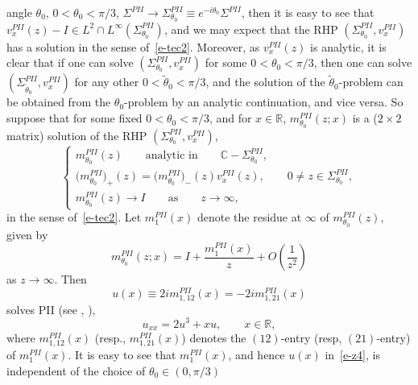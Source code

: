 \documentclass{amsart}
\theoremstyle{definition}
\theoremstyle{remark}
\numberwithin{equation}{section}
\newcommand{\C}{\mathbb C}
\newcommand{\R}{\mathbb R}
\newcommand{\wt}{\widetilde}
\begin{document}
angle $\theta_0$, $0<\theta_0<\pi/3$, $\Sigma^{PII}\to 
\Sigma^{PII}_{\theta_0}\equiv e^{-i\theta_0}\Sigma^{PII}$, then it is 
easy to see that $v_x^{PII}(z)-I\in 
L^2\cap L^{\infty}(\Sigma^{PII}_{\theta_0})$, 
and we may expect that the RHP $(\Sigma^{PII}_{\theta_0},v_x^{PII})$ 
has a solution in the sense of~\eqref{e-tec2}.
Moreover, as $v_x^{PII}(z)$ is analytic, it is clear that if one can 
solve $(\Sigma^{PII}_{\theta_0},v_x^{PII})$ for some $0<\theta_0<\pi/3$, 
then one can solve $(\Sigma^{PII}_{\wt{\theta}_0},v_x^{PII})$ 
for any other $0<\wt{\theta}_0<\pi/3$, and the solution of the 
$\wt{\theta}_0$-problem can be obtained from the $\theta_0$-problem 
by an analytic continuation, and vice versa.
So suppose that for some fixed $0<\theta_0<\pi/3$, and for 
$x\in\R$,  
$m_{\theta_0}^{PII}(z;x)$ is a ($2\times 2$ matrix) solution of the RHP 
$(\Sigma_{\theta_0}^{PII}, v_x^{PII})$, 
\begin{equation}\label{e-mPII}
  \begin{cases}
     m^{PII}_{\theta_0}(z) \qquad  
\text{analytic in} \qquad   \C -\Sigma_{\theta_0}^{PII},\\
     \bigl(m_{\theta_0}^{PII}\bigr)_+(z)=
\bigl(m_{\theta_0}^{PII}\bigr)_-(z) v_x^{PII}(z) , 
\qquad 0\neq z\in \Sigma_{\theta_0}^{PII},\\
     m^{PII}_{\theta_0}(z)\to I \qquad \text{as} \qquad z\to\infty, 
  \end{cases}
\end{equation}
in the sense of~\eqref{e-tec2}.
Let $m_1^{PII}(x)$ denote the residue at $\infty$ of 
$m_{\theta_0}^{PII}(z)$, given by
\begin{equation*}
   m_{\theta_0}^{PII}(z;x)=I+\frac{m_1^{PII}(x)}{z}+O(\frac1{z^2})
\end{equation*}
as $z\to\infty$.
Then 
\begin{equation}\label{e-z4}
   u(x)\equiv 2im_{1,12}^{PII}(x)=-2im_{1,21}^{PII}(x)
\end{equation}
solves PII (see \cite{FN}, \cite{JMU}), 
\begin{equation*}
   u_{xx}=2u^3+xu,\qquad x\in\R,
\end{equation*}
where $m_{1,12}^{PII}(x)$ (resp., $m_{1,21}^{PII}(x)$) denotes 
the $(12)$-entry (resp, $(21)$-entry) of $m_1^{PII}(x)$.
It is easy to see that $m_1^{PII}(x)$, and hence $u(x)$ in~\eqref{e-z4}, 
is independent of the choice of $\theta_0\in (0,\pi/3)$ 
\end{document}

